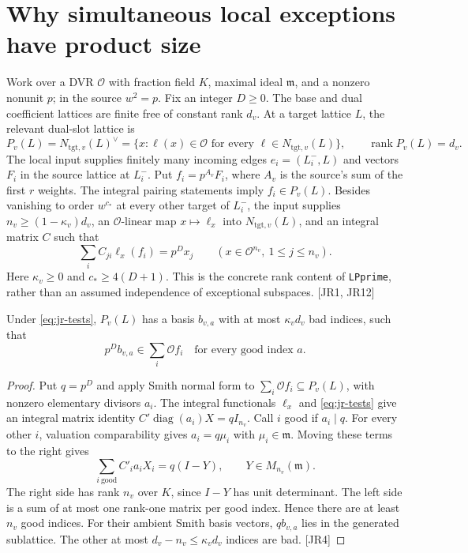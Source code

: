\section{Why simultaneous local exceptions have product size}\label{sec:joint-rank}


Work over a DVR $\mathcal O$ with fraction field $K$, maximal ideal $\mathfrak m$, and a nonzero nonunit $p$; in the source $w^2=p$. Fix an integer $D\ge0$. The base and dual coefficient lattices are finite free of constant rank $d_v$. At a target lattice $L$, the relevant dual-slot lattice is
\[
 P_v(L)=N_{\mathrm{tgt},v}(L)^\vee
   =\{x:\ell(x)\in\mathcal O\text{ for every }\ell\in N_{\mathrm{tgt},v}(L)\},
 \qquad \operatorname{rank}P_v(L)=d_v.
\]
The local input supplies finitely many incoming edges $e_i=(L_i^-,L)$ and vectors $F_i$ in the source lattice at $L_i^-$. Put $f_i=p^{A_v}F_i$, where $A_v$ is the source's sum of the first $r$ weights. The integral pairing statements imply $f_i\in P_v(L)$. Besides vanishing to order $w^{c_*}$ at every other target of $L_i^-$, the input supplies $n_v\ge(1-\kappa_v)d_v$, an $\mathcal O$-linear map $x\mapsto\ell_x$ into $N_{\mathrm{tgt},v}(L)$, and an integral matrix $C$ such that
\begin{equation}\label{eq:jr-tests}
 \sum_i C_{ji}\ell_x(f_i)=p^D x_j
 \qquad(x\in\mathcal O^{n_v},\ 1\le j\le n_v).
\end{equation}
Here $\kappa_v\ge0$ and $c_*\ge4(D+1)$. This is the concrete rank content of \texttt{LPprime}, rather than an assumed independence of exceptional subspaces. \textsf{[JR1, JR12]}

\begin{lemma}\label{lem:jr-smith}
Under \eqref{eq:jr-tests}, $P_v(L)$ has a basis $b_{v,a}$ with at most $\kappa_vd_v$ bad indices, such that
\[
 p^D b_{v,a}\in\sum_i\mathcal O f_i
 \quad\text{for every good index }a.
\]
\end{lemma}
\begin{proof}
Put $q=p^D$ and apply Smith normal form to $\sum_i\mathcal O f_i\subseteq P_v(L)$, with nonzero elementary divisors $a_i$. The integral functionals $\ell_x$ and \eqref{eq:jr-tests} give an integral matrix identity $C'\operatorname{diag}(a_i)X=qI_{n_v}$. Call $i$ good if $a_i\mid q$. For every other $i$, valuation comparability gives $a_i=q\mu_i$ with $\mu_i\in\mathfrak m$. Moving these terms to the right gives
\[
 \sum_{i\ \mathrm{good}} C'_i a_i X_i=q(I-Y),
 \qquad Y\in M_{n_v}(\mathfrak m).
\]
The right side has rank $n_v$ over $K$, since $I-Y$ has unit determinant. The left side is a sum of at most one rank-one matrix per good index. Hence there are at least $n_v$ good indices. For their ambient Smith basis vectors, $q b_{v,a}$ lies in the generated sublattice. The other at most $d_v-n_v\le\kappa_vd_v$ indices are bad. \textsf{[JR4]}
\end{proof}

